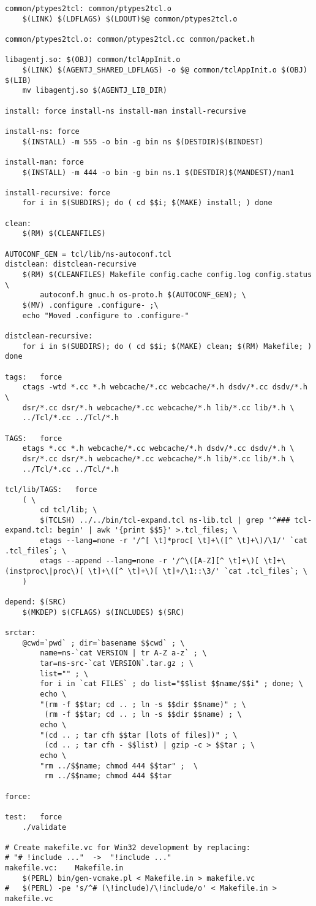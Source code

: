 \begin{verbatim}
common/ptypes2tcl: common/ptypes2tcl.o
	$(LINK) $(LDFLAGS) $(LDOUT)$@ common/ptypes2tcl.o

common/ptypes2tcl.o: common/ptypes2tcl.cc common/packet.h

libagentj.so: $(OBJ) common/tclAppInit.o
	$(LINK) $(AGENTJ_SHARED_LDFLAGS) -o $@ common/tclAppInit.o $(OBJ) $(LIB)
	mv libagentj.so $(AGENTJ_LIB_DIR)

install: force install-ns install-man install-recursive

install-ns: force
	$(INSTALL) -m 555 -o bin -g bin ns $(DESTDIR)$(BINDEST)

install-man: force
	$(INSTALL) -m 444 -o bin -g bin ns.1 $(DESTDIR)$(MANDEST)/man1

install-recursive: force
	for i in $(SUBDIRS); do ( cd $$i; $(MAKE) install; ) done

clean:
	$(RM) $(CLEANFILES)

AUTOCONF_GEN = tcl/lib/ns-autoconf.tcl
distclean: distclean-recursive
	$(RM) $(CLEANFILES) Makefile config.cache config.log config.status \
	    autoconf.h gnuc.h os-proto.h $(AUTOCONF_GEN); \
	$(MV) .configure .configure- ;\
	echo "Moved .configure to .configure-"

distclean-recursive:
	for i in $(SUBDIRS); do ( cd $$i; $(MAKE) clean; $(RM) Makefile; ) done

tags:	force
	ctags -wtd *.cc *.h webcache/*.cc webcache/*.h dsdv/*.cc dsdv/*.h \
	dsr/*.cc dsr/*.h webcache/*.cc webcache/*.h lib/*.cc lib/*.h \
	../Tcl/*.cc ../Tcl/*.h 

TAGS:	force
	etags *.cc *.h webcache/*.cc webcache/*.h dsdv/*.cc dsdv/*.h \
	dsr/*.cc dsr/*.h webcache/*.cc webcache/*.h lib/*.cc lib/*.h \
	../Tcl/*.cc ../Tcl/*.h

tcl/lib/TAGS:	force
	( \
		cd tcl/lib; \
		$(TCLSH) ../../bin/tcl-expand.tcl ns-lib.tcl | grep '^### tcl-expand.tcl: begin' | awk '{print $$5}' >.tcl_files; \
		etags --lang=none -r '/^[ \t]*proc[ \t]+\([^ \t]+\)/\1/' `cat .tcl_files`; \
		etags --append --lang=none -r '/^\([A-Z][^ \t]+\)[ \t]+\(instproc\|proc\)[ \t]+\([^ \t]+\)[ \t]+/\1::\3/' `cat .tcl_files`; \
	)

depend: $(SRC)
	$(MKDEP) $(CFLAGS) $(INCLUDES) $(SRC)

srctar:
	@cwd=`pwd` ; dir=`basename $$cwd` ; \
	    name=ns-`cat VERSION | tr A-Z a-z` ; \
	    tar=ns-src-`cat VERSION`.tar.gz ; \
	    list="" ; \
	    for i in `cat FILES` ; do list="$$list $$name/$$i" ; done; \
	    echo \
	    "(rm -f $$tar; cd .. ; ln -s $$dir $$name)" ; \
	     (rm -f $$tar; cd .. ; ln -s $$dir $$name) ; \
	    echo \
	    "(cd .. ; tar cfh $$tar [lots of files])" ; \
	     (cd .. ; tar cfh - $$list) | gzip -c > $$tar ; \
	    echo \
	    "rm ../$$name; chmod 444 $$tar" ;  \
	     rm ../$$name; chmod 444 $$tar

force:

test:	force
	./validate

# Create makefile.vc for Win32 development by replacing:
# "# !include ..." 	-> 	"!include ..."
makefile.vc:	Makefile.in
	$(PERL) bin/gen-vcmake.pl < Makefile.in > makefile.vc
#	$(PERL) -pe 's/^# (\!include)/\!include/o' < Makefile.in > makefile.vc
\end{verbatim}
\normalsize


